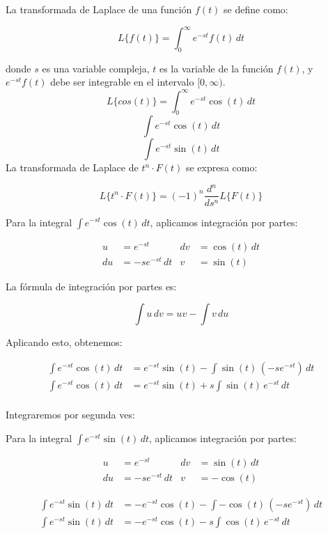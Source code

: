 \documentclass{article}
\begin{document}
La transformada de Laplace de una función $f(t)$ se define como:

\[ L\{f(t)\} = \int_{0}^{\infty} e^{-st} f(t) \, dt \]

donde $s$ es una variable compleja, $t$ es la variable de la función $f(t)$, y $e^{-st} f(t)$ debe ser integrable en el intervalo $[0, \infty)$.\\


\[ L\{cos(t)\} = \int_{0}^{\infty} e^{-st} \cos(t) \, dt\]
\[ \int e^{-st} \cos(t) \, dt\]
\[ \int e^{-st} \sin(t) \, dt\]
La transformada de Laplace de \(t^n \cdot F(t)\) se expresa como:

\[ L\{t^n \cdot F(t)\} = (-1)^n \frac{d^n}{ds^n} L\{F(t)\} \]


Para la integral $\int e^{-st} \cos(t) \, dt$, aplicamos integración por partes:

\begin{align*}
u &= e^{-st} & dv &= \cos(t) \, dt \\
du &= -se^{-st} \, dt & v &= \sin(t)
\end{align*}

La fórmula de integración por partes es:

\[
\int u \, dv = uv - \int v \, du
\]

Aplicando esto, obtenemos:

\begin{align*}
\int e^{-st} \cos(t) \, dt &= e^{-st} \sin(t) - \int \sin(t) \, (-se^{-st}) \, dt \\
\int e^{-st} \cos(t) \, dt &= e^{-st} \sin(t) + s \int \sin(t) \, e^{-st} \, dt \\
\end{align*}

Integraremos por segunda ves:

Para la integral $\int e^{-st} \sin(t) \, dt$, aplicamos integración por partes:

\begin{align*}
u &= e^{-st} & dv &= \sin(t) \, dt \\
du &= -se^{-st} \, dt & v &= -\cos(t)
\end{align*}


\begin{align*}
\int e^{-st} \sin(t) \, dt &= -e^{-st} \cos(t) - \int -\cos(t) \, (-se^{-st}) \, dt \\
\int e^{-st} \sin(t) \, dt &= -e^{-st} \cos(t) - s\int \cos(t) \, e^{-st} \, dt \\
\end{align*}
\end{document}
